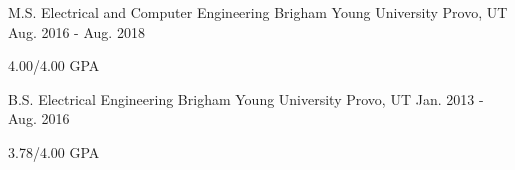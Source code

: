 

\begin{cventries}

\cventry
	{M.S. Electrical and Computer Engineering} %
	{Brigham Young University} %
	{Provo, UT} %
	{Aug. 2016 - Aug. 2018} %
	{
		\begin{cvitems} %
			\item 4.00/4.00 GPA
		\end{cvitems}
	}
	
  \cventry
    {B.S. Electrical Engineering} %
    {Brigham Young University} %
    {Provo, UT} %
    {Jan. 2013 - Aug. 2016} %
    {
      \begin{cvitems} %
        \item 3.78/4.00 GPA
      \end{cvitems}
    }

\end{cventries}
